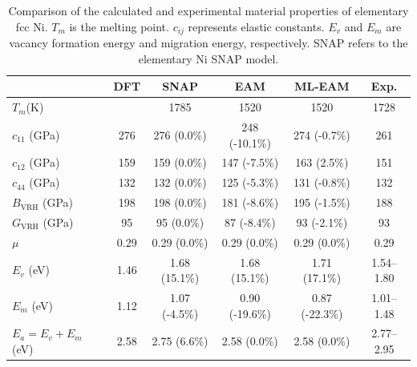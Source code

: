 \documentclass[final,3p,times]{elsarticle}
\begin{document}
% 
%
\begin{table}
\centering
\begin{tabular}{lccccc}
\hline
                              & DFT  & SNAP \cite{SNAP} & EAM              & ML-EAM         & Exp.                           \\
\hline
$T_{m}$(K)                    &      & 1785             & 1520 \cite{ZJW2} & 1520           & 1728                           \\
$c_{11}$ (GPa)                & 276  & 276 (0.0\%)      & 248 (-10.1\%)    & 274 (-0.7\%)   & 261 \cite{Ni_Elastic_Exp}      \\
$c_{12}$ (GPa)                & 159  & 159 (0.0\%)      & 147 (-7.5\%)     & 163 (2.5\%)    & 151 \cite{Ni_Elastic_Exp}      \\
$c_{44}$ (GPa)                & 132  & 132 (0.0\%)      & 125 (-5.3\%)     & 131 (-0.8\%)   & 132 \cite{Ni_Elastic_Exp}      \\
$B_{\mathrm{VRH}}$ (GPa)      & 198  & 198 (0.0\%)      & 181 (-8.6\%)     & 195 (-1.5\%)    & 188                           \\
$G_{\mathrm{VRH}}$ (GPa)      & 95   & 95 (0.0\%)       & 87 (-8.4\%)      & 93 (-2.1\%)    & 93                             \\
$\mu$                         & 0.29 & 0.29 (0.0\%)     & 0.29 (0.0\%)     & 0.29 (0.0\%)   & 0.29                           \\
$E_{v}$ (eV)                  & 1.46 & 1.68 (15.1\%)    & 1.68 (15.1\%)    & 1.71 (17.1\%)  & 1.54–1.80 \cite{Ni_EvEmEa_Exp} \\
$E_{m}$ (eV)                  & 1.12 & 1.07 (-4.5\%)    & 0.90 (-19.6\%)   & 0.87 (-22.3\%) & 1.01–1.48 \cite{Ni_EvEmEa_Exp} \\
$E_{a} = E_{v} + E_{m} $ (eV) & 2.58 & 2.75 (6.6\%)     & 2.58 (0.0\%)     & 2.58 (0.0\%)   & 2.77–2.95 \cite{Ni_EvEmEa_Exp} \\
\hline
\end{tabular}
\caption{\label{table:Ni_properties} Comparison of the calculated and 
experimental material properties of elementary fcc Ni. $T_{m}$ is the melting 
point. $c_{ij}$ represents elastic constants. $E_{v}$ and $E_{m}$ are vacancy 
formation energy and migration energy, respectively. SNAP refers to the 
elementary Ni SNAP model.
}
\end{table}
\end{document}
